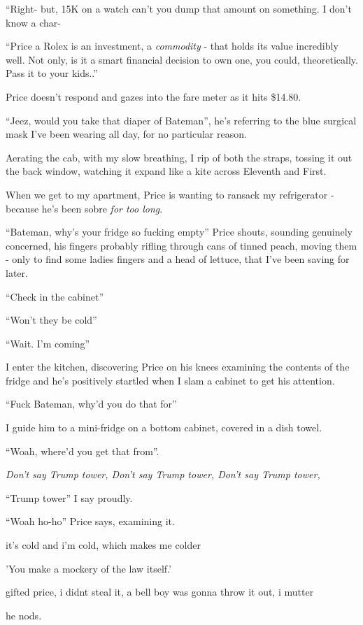 \documentclass[19pt,openany]{book}
\begin{document}
``Right- but, 15K on a watch
can't you dump that amount
on something. I don't
know a char-

``Price a Rolex is an investment,
a \textit{commodity} - that holds
its value incredibly well.
Not only, is it a smart
financial decision to own
one, you could, theoretically.
Pass it to your kids..''

Price doesn't respond and
gazes into the fare meter
as it hits \$14.80.

``Jeez, would you take that
diaper of Bateman'', he's
referring to the blue surgical
mask I've been wearing all day,
for no particular reason.

Aerating the cab,
with my slow breathing,
I rip of both the straps, tossing
it out the
back window, watching
it expand like a kite
across Eleventh and First.


When we get to my apartment, Price
is wanting to ransack my
refrigerator - because
he's been sobre \textit{for
too long}.

``Bateman, why's your fridge so fucking empty''
Price shouts, sounding genuinely concerned, his fingers
probably rifling through cans of tinned peach,
moving them - only to find
some ladies fingers and a head of lettuce, that
I've been saving for later.

``Check in the cabinet''

``Won't they be cold''

``Wait. I'm coming''

I enter the kitchen,
discovering Price on his
knees examining the contents
of the fridge and he's positively
startled when I slam a cabinet
to get his attention.

``Fuck Bateman, why'd
you do that for''

I guide him to a mini-fridge
on a bottom cabinet,
covered in a dish towel.

``Woah, where'd you get that from''.

\textit{Don't say Trump tower,
Don't say Trump tower,
Don't say Trump tower,}

``Trump tower'' I say proudly.

``Woah ho-ho'' Price says, examining it.

it's cold and i'm cold, which makes me colder

'You make a mockery of the law itself.'

gifted price, i didnt steal it,
a bell boy was gonna throw it out,
i mutter

he nods.
\end{document}
